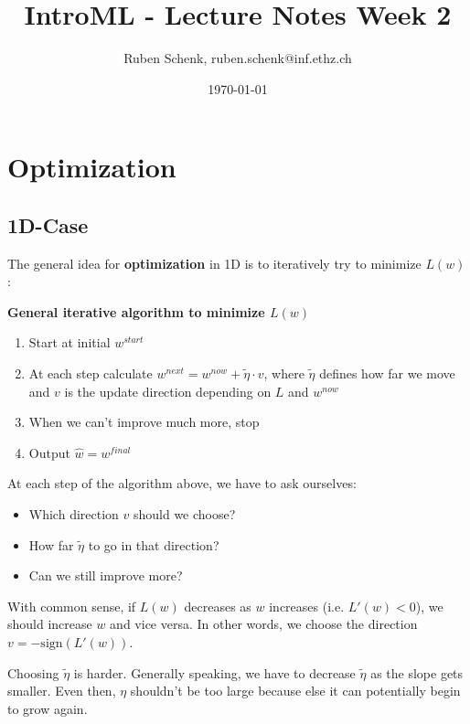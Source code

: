 \documentclass[a4paper]{extarticle}
\title{IntroML - Lecture Notes Week 2}
\author{Ruben Schenk, ruben.schenk@inf.ethz.ch}
\date{\today}
\begin{document}
\maketitle

\section{Optimization}

\subsection{1D-Case}

The general idea for \textbf{optimization} in 1D is to iteratively try to minimize \(L(w)\):

\begin{cbox}
    \textbf{General iterative algorithm to minimize \(L(w)\)}

    \begin{enumerate}
        \item Start at initial \(w^{start}\)
        \item At each step calculate \(w^{next} = w^{now} + \tilde{\eta} \cdot v\), where \(\tilde{\eta}\) defines how far we move and \(v\) is the update direction depending on \(L\) and \(w^{now}\)
        \item When we can't improve much more, stop
        \item Output \(\hat{w} = w^{final}\)
    \end{enumerate}
\end{cbox}

At each step of the algorithm above, we have to ask ourselves:

\begin{itemize}
    \item Which direction \(v\) should we choose?
    \item How far \(\tilde{\eta}\) to go in that direction?
    \item Can we still improve more?
\end{itemize}

With common sense, if \(L(w)\) decreases as \(w\) increases (i.e. \(L'(w) < 0\)), we should increase \(w\) and vice versa. In other words, we choose the direction \(v = - \text{sign}(L'(w))\).

Choosing \(\tilde{\eta}\) is harder. Generally speaking, we have to decrease \(\tilde{\eta}\) as the slope gets smaller. Even then, \(\eta\) shouldn't be too large because else it can potentially begin to grow again.
\end{document}
